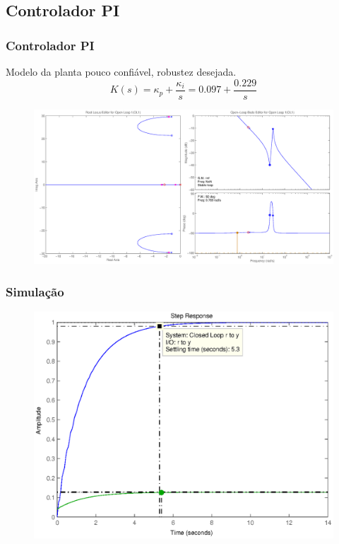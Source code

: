 \documentclass{beamer}
\begin{document}
\subsection{Controlador PI}
\begin{frame}
	\frametitle{Controlador PI}
	Modelo da planta pouco confiável, robustez desejada.
	\begin{equation*}
	K(s) = \kappa_p + \frac{\kappa_i}{s} = 0.097 + \frac{0.229}{s}
	\end{equation*}
	\begin{figure}
		\includegraphics[height=0.4\linewidth]{../sisotool}
	\end{figure}
\end{frame}
\begin{frame}
	\frametitle{Simulação}
	\begin{figure}
		\includegraphics[height=0.6\linewidth]{../bla}
	\end{figure}
\end{frame}
\end{document}
